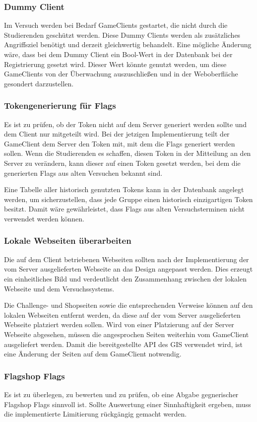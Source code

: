 \subsubsection{Dummy Client}
Im Versuch werden bei Bedarf GameClients gestartet, die nicht durch die Studierenden geschützt werden. Diese Dummy Clients werden als zusätzliches Angriffsziel benötigt und derzeit gleichwertig behandelt. Eine mögliche Änderung wäre, dass bei dem Dummy Client ein Bool-Wert in der Datenbank bei der Registrierung gesetzt wird. Dieser Wert könnte genutzt werden, um diese GameClients von der Überwachung auszuschließen und in der Weboberfläche gesondert darzustellen.

\subsubsection{Tokengenerierung für Flags}
Es ist zu prüfen, ob der Token nicht auf dem Server generiert werden sollte und dem Client nur mitgeteilt wird. Bei der jetzigen Implementierung teilt der GameClient dem Server den Token mit, mit dem die Flags generiert werden sollen. Wenn die Studierenden es schaffen, diesen Token in der Mitteilung an den Server zu verändern, kann dieser auf einen Token gesetzt werden, bei dem die generierten Flags aus alten Versuchen bekannt sind.

Eine Tabelle aller historisch genutzten Tokens kann in der Datenbank angelegt werden, um sicherzustellen, dass jede Gruppe einen historisch einzigartigen Token besitzt. Damit wäre gewährleistet, dass Flags aus alten Versuchsterminen nicht verwendet werden können.

\subsubsection{Lokale Webseiten überarbeiten}
Die auf dem Client betriebenen Webseiten sollten nach der Implementierung der vom Server ausgelieferten Webseite an das Design angepasst werden. Dies erzeugt ein einheitliches Bild und verdeutlicht den Zusammenhang zwischen der lokalen Webseite und dem Versuchssystems.

Die Challenge- und Shopseiten sowie die entsprechenden Verweise können auf den lokalen Webseiten entfernt werden, da diese auf der vom Server ausgelieferten Webseite platziert werden sollen. Wird von einer Platzierung auf der Server Webseite abgesehen, müssen die angesprochen Seiten weiterhin vom GameClient ausgeliefert werden. Damit die bereitgestellte API des GIS verwendet wird, ist eine Änderung der Seiten auf dem GameClient notwendig.

\subsubsection{Flagshop Flags}
Es ist zu überlegen, zu bewerten und zu prüfen, ob eine Abgabe gegnerischer Flagshop Flags sinnvoll ist. Sollte Auswertung einer Sinnhaftigkeit ergeben, muss die implementierte Limitierung rückgängig gemacht werden.